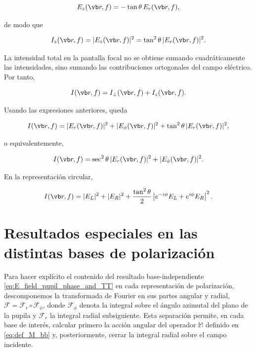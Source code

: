 \begin{equation}
  E_z(\vb r, f)
  =
  -\tan\theta\,
  E_r(\vb r, f),
\end{equation}

de modo que

\begin{equation}
  I_z(\vb r, f)
  =
  |E_z(\vb r, f)|^2
  =
  \tan^2\theta\,
  |E_r(\vb r, f)|^2 .
\end{equation}

La intensidad total en la pantalla focal no se obtiene sumando cuadráticamente las intensidades, sino sumando las contribuciones ortogonales del campo eléctrico. Por tanto,

\begin{equation}
  I(\vb r, f)
  =
  I_\perp(\vb r, f)
  +
  I_z(\vb r, f).
  \label{eq:Intensity_in_Focal_Plane}
\end{equation}

Usando las expresiones anteriores, queda

\begin{equation}
  I(\vb r, f)
  =
  |E_r(\vb r, f)|^2
  +
  |E_\phi(\vb r, f)|^2
  +
  \tan^2\theta\,
  |E_r(\vb r, f)|^2 ,
\end{equation}

o equivalentemente,

\begin{equation}
  I(\vb r, f)
  =
  \sec^2\theta\,
  |E_r(\vb r, f)|^2
  +
  |E_\phi(\vb r, f)|^2 .
\end{equation}

En la representación circular,

\begin{equation}
  I(\vb r,f)
  =
  |E_L|^2
  +
  |E_R|^2
  +
  \frac{\tan^2\theta}{2}
  \left|
  e^{-i\phi}E_L
  +
  e^{i\phi}E_R
  \right|^2 .
  \label{eq:total_intensity_circular_basis_compact}
\end{equation}

\section{Resultados especiales en las distintas bases de polarización}

Para hacer explícito el contenido del resultado base-independiente \eqref{eq:E_field_pupil_phase_and_TT} en cada representación de polarización, descomponemos la transformada de Fourier en sus partes angular y radial, $\mathscr{F} = \mathscr{F}_r \circ \mathscr{F}_\phi$, donde $\mathscr{F}_\phi$ denota la integral sobre el ángulo azimutal del plano de la pupila y $\mathscr{F}_r$ la integral radial subsiguiente. Esta separación permite, en cada base de interés, calcular primero la acción angular del operador $\mathbb{M}$ definido en \eqref{eq:def_M_bb} y, posteriormente, cerrar la integral radial sobre el campo incidente.

